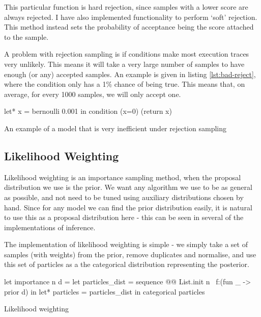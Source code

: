This particular function is hard rejection, since samples with a lower score are always rejected. I have also implemented functionality to perform `soft' rejection. This method instead sets the probability of acceptance being the score attached to the sample.

A problem with rejection sampling is if conditions make most execution traces very unlikely. This means it will take a very large number of samples to have enough (or any) accepted samples. An example is given in listing \ref{lst:bad-reject}, where the condition only has a 1\% chance of being true. This means that, on average, for every 1000 samples, we will only accept one.

\begin{listing}[!htb]
	\centering
	\begin{ocamlcode-in}
let* x = bernoulli 0.001 in
condition (x=0)
(return x)
	\end{ocamlcode-in}
	
	\caption{An example of a model that is very inefficient under rejection sampling}
	\label{lst:bad-reject}
\end{listing}
% 
\subsection{Likelihood Weighting} \label{sec:likelihood-wighting}
	
Likelihood weighting is an importance sampling method, when the proposal distribution we use is the prior. We want any algorithm we use to be as general as possible, and not need to be tuned using auxiliary distributions chosen by hand. Since for any model we can find the prior distribution easily, it is natural to use this as a proposal distribution here - this can be seen in several of the implementations of inference. 

The implementation of likelihood weighting is simple - we simply take a set of samples (with weights) from the prior, remove duplicates and normalise, and use this set of particles as a the categorical distribution representing the posterior.
\begin{listing}[!htb]
	\centering
	\begin{ocamlcode-in}
let importance n d = 
  let particles_dist = sequence @@ List.init n ~f:(fun _ -> prior d) in
  let* particles = particles_dist in 
  categorical particles
	\end{ocamlcode-in}
	\caption{Likelihood weighting}
	\label{lst:imp}
\end{listing}

